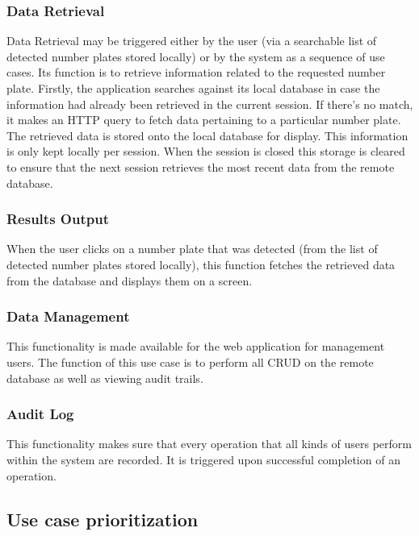 \documentclass[12pt]{article}
\begin{document}
                    		\subsubsection{Data Retrieval}
                    				Data Retrieval may be triggered either by the user (via a searchable list of detected number plates stored locally) or by the system as a sequence of use cases. Its function is to retrieve information related to the requested number plate. Firstly, the application searches against its local database in case the information had already been retrieved in the current session. If there's no match, it makes an HTTP query to fetch data pertaining to a particular number plate. The retrieved data is stored onto the local database for display. This information is only kept locally per session. When the session is closed this storage is cleared to ensure that the next session retrieves the most recent data from the remote database.
                    		
                    		\subsubsection{Results Output}
                    				When the user clicks on a number plate that was detected (from the list of detected number plates stored locally), this function fetches the retrieved data from the database  and displays them on a screen.
                    				
                    				
                    		\subsubsection{Data Management}
                    				This functionality is made available for the web application for management users. The function of this use case is to perform all CRUD on the remote database as well as viewing audit trails.
                    				
                    		\subsubsection{Audit Log}
                    				This functionality makes sure that every operation that all kinds of users perform within the system are recorded. It is triggered upon successful completion of an operation.
                    				
                    \subsection{Use case prioritization}
\end{document}
